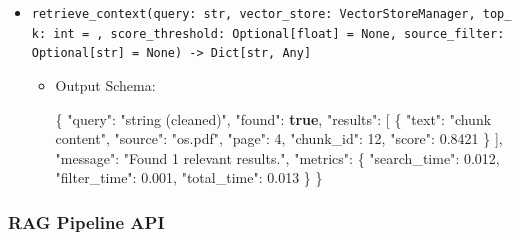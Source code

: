 \documentclass[
]{article}
\newenvironment{Shaded}{}{}
\newcommand{\DataTypeTok}[1]{\textcolor[rgb]{0.56,0.13,0.00}{#1}}
\newcommand{\DecValTok}[1]{\textcolor[rgb]{0.25,0.63,0.44}{#1}}
\newcommand{\FloatTok}[1]{\textcolor[rgb]{0.25,0.63,0.44}{#1}}
\newcommand{\FunctionTok}[1]{\textcolor[rgb]{0.02,0.16,0.49}{#1}}
\newcommand{\KeywordTok}[1]{\textcolor[rgb]{0.00,0.44,0.13}{\textbf{#1}}}
\newcommand{\OtherTok}[1]{\textcolor[rgb]{0.00,0.44,0.13}{#1}}
\newcommand{\StringTok}[1]{\textcolor[rgb]{0.25,0.44,0.63}{#1}}
\providecommand{\tightlist}{%
  \setlength{\itemsep}{0pt}\setlength{\parskip}{0pt}}
\begin{document}
\begin{itemize}
\tightlist
\item
  \texttt{retrieve\_\allowbreak context(\allowbreak query:\ \allowbreak str,\allowbreak \ \allowbreak vector\_\allowbreak store:\ \allowbreak VectorStoreManager,\allowbreak \ \allowbreak top\_\allowbreak k:\ \allowbreak int\ \allowbreak =\allowbreak \ ,\allowbreak \ \allowbreak score\_\allowbreak threshold:\ \allowbreak Optional{[}float{]}\ \allowbreak =\allowbreak \ \allowbreak None,\allowbreak \ \allowbreak source\_\allowbreak filter:\ \allowbreak Optional{[}str{]}\ \allowbreak =\allowbreak \ \allowbreak None)\allowbreak \ \allowbreak -\textgreater{}\allowbreak \ \allowbreak Dict{[}str,\allowbreak \ \allowbreak Any{]}}

  \begin{itemize}
  \item
    Output Schema:

\begin{Shaded}
\begin{Highlighting}[]
\FunctionTok{\{}
  \DataTypeTok{"query"}\FunctionTok{:} \StringTok{"string (cleaned)"}\FunctionTok{,}
  \DataTypeTok{"found"}\FunctionTok{:} \KeywordTok{true}\FunctionTok{,}
  \DataTypeTok{"results"}\FunctionTok{:} \OtherTok{[}
    \FunctionTok{\{}
      \DataTypeTok{"text"}\FunctionTok{:} \StringTok{"chunk content"}\FunctionTok{,}
      \DataTypeTok{"source"}\FunctionTok{:} \StringTok{"os.pdf"}\FunctionTok{,}
      \DataTypeTok{"page"}\FunctionTok{:} \DecValTok{4}\FunctionTok{,}
      \DataTypeTok{"chunk\_id"}\FunctionTok{:} \DecValTok{12}\FunctionTok{,}
      \DataTypeTok{"score"}\FunctionTok{:} \FloatTok{0.8421}
    \FunctionTok{\}}
  \OtherTok{]}\FunctionTok{,}
  \DataTypeTok{"message"}\FunctionTok{:} \StringTok{"Found 1 relevant results."}\FunctionTok{,}
  \DataTypeTok{"metrics"}\FunctionTok{:} \FunctionTok{\{}
    \DataTypeTok{"search\_time"}\FunctionTok{:} \FloatTok{0.012}\FunctionTok{,}
    \DataTypeTok{"filter\_time"}\FunctionTok{:} \FloatTok{0.001}\FunctionTok{,}
    \DataTypeTok{"total\_time"}\FunctionTok{:} \FloatTok{0.013}
  \FunctionTok{\}}
\FunctionTok{\}}
\end{Highlighting}
\end{Shaded}
  \end{itemize}
\end{itemize}

\subsubsection{RAG Pipeline API}\label{rag-pipeline-api}
\end{document}
